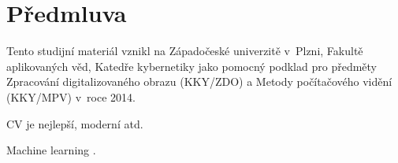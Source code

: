 

\chapter{Předmluva}
\label{sec:Predmluva}

\par{Tento studijní materiál vznikl na Západočeské univerzitě v~Plzni, Fakultě aplikovaných věd, Katedře kybernetiky jako pomocný podklad pro předměty Zpracování digitalizovaného obrazu (KKY/ZDO) a Metody počítačového vidění (KKY/MPV) v~roce 2014.}

\par{CV je nejlepší, moderní atd.}

\par{Machine learning .}

\newpage